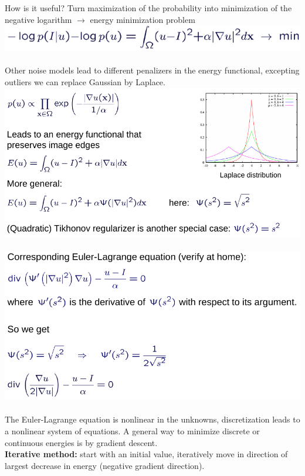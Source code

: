 \documentclass{article}
\begin{document}
How is it useful? Turn maximization of the probability into minimization of the negative logarithm $\rightarrow$ energy minimization problem\\
\includegraphics[scale=0.3]{46.png}\\\\
Other noise models lead to different penalizers in the energy functional, excepting outliers we can replace Gaussian by Laplace.\\
\includegraphics[scale=0.3]{47.png}\\\\
\includegraphics[scale=0.3]{48.png}\\\\
The Euler-Lagrange equation is nonlinear in the unknowns, discretization leads to a nonlinear system of equations. A general way to minimize discrete or continuous energies is by gradient descent.\\
\textbf{Iterative method:} start with an initial value, iteratively move in direction of
largest decrease in energy (negative gradient direction).\\\\
\end{document}
